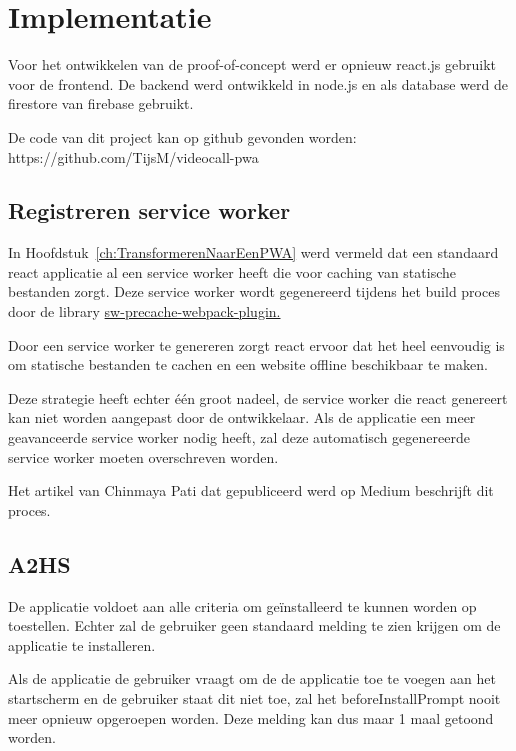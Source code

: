 	
\section{Implementatie}
	Voor het ontwikkelen van de proof-of-concept werd er opnieuw react.js gebruikt voor de frontend. De backend werd ontwikkeld in node.js en als database werd de firestore van firebase gebruikt.
	
	De code van dit project kan op github gevonden worden: https://github.com/TijsM/videocall-pwa
	
	\subsection{Registreren service worker}
		
		In Hoofdstuk~\ref{ch:TransformerenNaarEenPWA} werd vermeld dat een standaard react applicatie al een service worker heeft die voor caching van statische bestanden zorgt. Deze service worker wordt gegenereerd tijdens het build proces door de library \href{https://github.com/goldhand/sw-precache-webpack-plugin}{sw-precache-webpack-plugin. }  
		\autocite{Mester2019}
		
		Door een service worker te genereren zorgt react ervoor dat het heel eenvoudig is om statische bestanden te cachen en een website offline beschikbaar te maken.
		
		Deze strategie heeft echter één groot nadeel, de service worker die react genereert kan niet worden aangepast door de ontwikkelaar. Als de applicatie een meer geavanceerde service worker nodig heeft, zal deze automatisch gegenereerde service worker moeten overschreven worden.
		
		Het artikel van Chinmaya Pati dat gepubliceerd werd op Medium beschrijft dit proces. \autocite{Pati2019}
		
	\subsection{A2HS}
	
		De applicatie voldoet aan alle criteria om geïnstalleerd te kunnen worden op toestellen. Echter zal de gebruiker geen standaard melding te zien krijgen om de applicatie te installeren.		
		
		Als de applicatie de gebruiker vraagt om de de applicatie toe te voegen aan het startscherm en de gebruiker staat dit niet toe, zal het beforeInstallPrompt nooit meer opnieuw opgeroepen worden. Deze melding kan dus maar 1 maal getoond worden.
		
